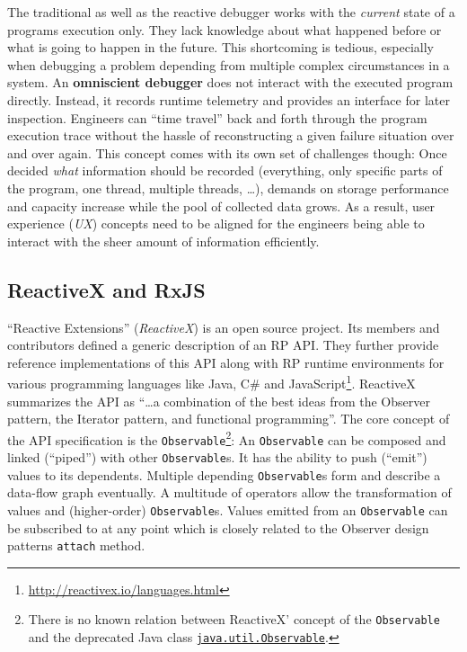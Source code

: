 \documentclass[12pt,a4paper]{article}
\begin{document}
The traditional as well as the reactive debugger works with the \emph{current} state of a programs execution only. They lack knowledge about what happened before or what is going to happen in the future. This shortcoming is tedious, especially when debugging a problem depending from multiple complex circumstances in a system. An \textbf{omniscient debugger} \cite{5287015} \cite{DBLP:journals/corr/OCallahanJFHNP17} does not interact with the executed program directly. Instead, it records runtime telemetry and provides an interface for later inspection. Engineers can ``time travel'' back and forth through the program execution trace without the hassle of reconstructing a given failure situation over and over again. This concept comes with its own set of challenges though: Once decided \emph{what} information should be recorded (everything, only specific parts of the program, one thread, multiple threads, \dots), demands on storage performance and capacity increase while the pool of collected data grows. As a result, user experience (\emph{UX}) concepts need to be aligned for the engineers being able to interact with the sheer amount\cite{5287015} of information efficiently.

\subsection{ReactiveX and RxJS}

``Reactive Extensions'' (\emph{ReactiveX}) is an open source project. Its members and contributors defined a generic description of an RP API. They further provide reference implementations of this API along with RP runtime environments for various programming languages like Java, C\# and JavaScript\footnote{\url{http://reactivex.io/languages.html}}. ReactiveX summarizes the API as ``\dots a combination of the best ideas from the Observer pattern, the Iterator pattern, and functional programming''\cite{reactivex}. The core concept of the API specification is the \texttt{Observable}\footnote{There is no known relation between ReactiveX' concept of the \texttt{Observable} and the deprecated Java class \href{https://docs.oracle.com/en/java/javase/11/docs/api/java.base/java/util/Observable.html}{\texttt{java.util.Observable}}.}: An \texttt{Observable} can be composed and linked (``piped'') with other \texttt{Observable}s. It has the ability to push (``emit'') values to its dependents. Multiple depending \texttt{Observable}s form and describe a data-flow graph eventually. A multitude of operators allow the transformation of values and (higher-order) \texttt{Observable}s. Values emitted from an \texttt{Observable} can be subscribed to at any point which is closely related to the Observer design patterns \texttt{attach} method.
\end{document}
